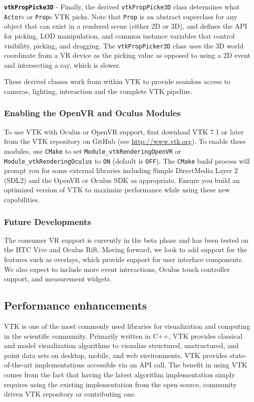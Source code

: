 \textbf{\texttt{vtkPropPicke3D}} - Finally, the derived \texttt{vtkPropPicke3D} class determines what \texttt{Actor}s or \texttt{Prop}s VTK picks.
Note that \texttt{Prop} is an abstract superclass for any object that can exist in a rendered scene (either 2D or 3D), and defines the API for picking, LOD manipulation, and common instance variables that control visibility, picking, and dragging.
The \texttt{vtkPropPicker3D} class uses the 3D world coordinate from a VR device as the picking value as opposed to using a 2D event and intersecting a ray, which is slower.

These derived classes work from within VTK to provide seamless access to cameras, lighting, interaction and the complete VTK pipeline.

\subsubsection{Enabling the OpenVR and Oculus Modules}

To use VTK with Oculus or OpenVR support, first download VTK 7.1 or later from the VTK
repository on GitHub (see \url{http://www.vtk.org}).
To enable these modules, use \texttt{CMake} to set \texttt{Module\_vtkRenderingOpenVR} or \texttt{Module\_vtkRenderingOculus} to \texttt{ON} (default is \texttt{OFF}).
The \texttt{CMake} build process will prompt you for some external libraries including Simple DirectMedia Layer 2 (SDL2) and the OpenVR or Oculus SDK as appropriate.
Ensure you build an optimized version of VTK to maximize performance while using these new capabilities.

\subsubsection{Future Developments}

The consumer VR support is currently in the beta phase and has been tested on the HTC Vive and Oculus Rift. Moving forward, we look to add support for the features such as overlays, which provide support for user interface components. We also expect to include more event interactions, Oculus touch controller support, and measurement widgets.

\subsection{Performance enhancements}

VTK is one of the most commonly used libraries for visualization and computing in the scientific community.
Primarily written in C++, VTK provides classical and model visualization algorithms to visualize structured, unstructured, and point data sets on desktop, mobile, and web environments.
VTK provides state-of-the-art implementations accessible via an API call.
The benefit in using VTK comes from the fact that having the latest algorithm implementation simply requires using the existing implementation from the
open source, community driven VTK repository or contributing one.


